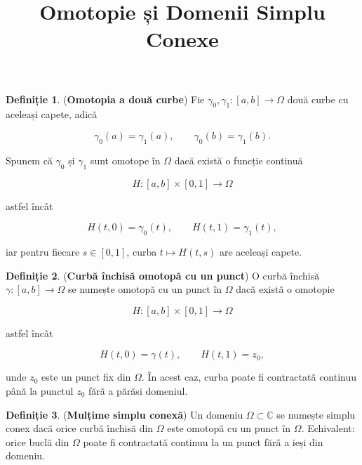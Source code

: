 \documentclass[12pt]{article}
\title{Omotopie și Domenii Simplu Conexe}
\author{}
\date{}
\theoremstyle{definition}
\newtheorem{definition}{Definiție}
\theoremstyle{plain}
\begin{document}
\maketitle

\begin{definition}
(\textbf{Omotopia a două curbe})  
Fie $\gamma_0, \gamma_1 : [a,b] \to \Omega$ două curbe cu aceleași capete, adică



\[
\gamma_0(a)=\gamma_1(a), \qquad \gamma_0(b)=\gamma_1(b).
\]



Spunem că $\gamma_0$ și $\gamma_1$ sunt omotope în $\Omega$ dacă există o funcție continuă



\[
H : [a,b] \times [0,1] \to \Omega
\]



astfel încât



\[
H(t,0)=\gamma_0(t), \qquad H(t,1)=\gamma_1(t),
\]



iar pentru fiecare $s\in[0,1]$, curba $t \mapsto H(t,s)$ are aceleași capete.
\end{definition}

\begin{definition}
(\textbf{Curbă închisă omotopă cu un punct})  
O curbă închisă $\gamma : [a,b] \to \Omega$ se numește omotopă cu un punct în $\Omega$ dacă există o omotopie



\[
H : [a,b] \times [0,1] \to \Omega
\]



astfel încât



\[
H(t,0)=\gamma(t), \qquad H(t,1)=z_0,
\]



unde $z_0$ este un punct fix din $\Omega$.  
În acest caz, curba poate fi contractată continuu până la punctul $z_0$ fără a părăsi domeniul.
\end{definition}

\begin{definition}
(\textbf{Mulțime simplu conexă})  
Un domeniu $\Omega \subset \mathbb{C}$ se numește simplu conex dacă orice curbă închisă din $\Omega$ este omotopă cu un punct în $\Omega$.  
Echivalent: orice buclă din $\Omega$ poate fi contractată continuu la un punct fără a ieși din domeniu.
\end{definition}
\end{document}
